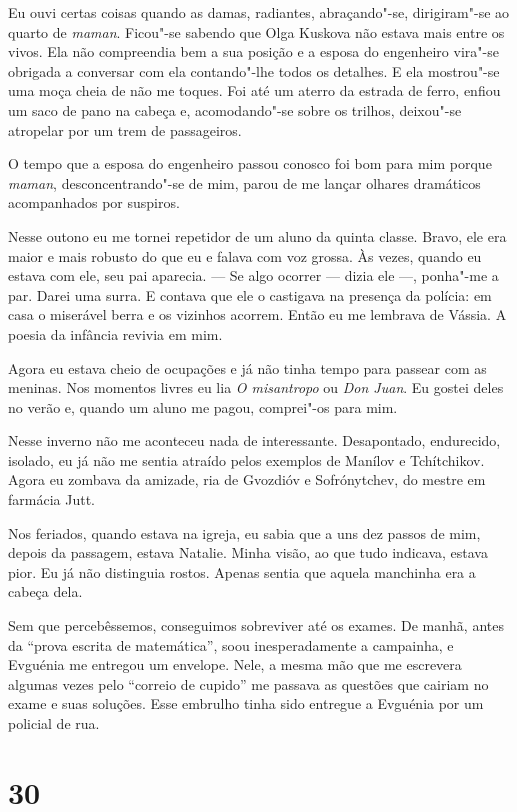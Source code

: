 Eu ouvi certas coisas quando as damas, radiantes, abraçando"-se,
dirigiram"-se ao quarto de \emph{maman}. Ficou"-se sabendo que Olga
Kuskova não estava mais entre os vivos. Ela não compreendia bem a sua
posição e a esposa do engenheiro vira"-se obrigada a conversar com ela
contando"-lhe todos os detalhes. E ela mostrou"-se uma moça cheia de não
me toques. Foi até um aterro da estrada de ferro, enfiou um saco de pano
na cabeça e, acomodando"-se sobre os trilhos, deixou"-se atropelar por um
trem de passageiros.

O tempo que a esposa do engenheiro passou conosco foi bom para mim
porque \emph{maman}, desconcentrando"-se de mim, parou de me lançar
olhares dramáticos acompanhados por suspiros.

Nesse outono eu me tornei repetidor de um aluno da quinta classe. Bravo,
ele era maior e mais robusto do que eu e falava com voz grossa. Às
vezes, quando eu estava com ele, seu pai aparecia. --- Se algo ocorrer
--- dizia ele ---, ponha"-me a par. Darei uma surra. E contava que ele o
castigava na presença da polícia: em casa o miserável berra e os
vizinhos acorrem. Então eu me lembrava de Vássia. A poesia da infância
revivia em mim.

Agora eu estava cheio de ocupações e já não tinha tempo para passear com
as meninas. Nos momentos livres eu lia \emph{O misantropo} ou \emph{Don
Juan}. Eu gostei deles no verão e, quando um aluno me pagou, comprei"-os
para mim.

Nesse inverno não me aconteceu nada de interessante. Desapontado,
endurecido, isolado, eu já não me sentia atraído pelos exemplos de
Manílov e Tchítchikov. Agora eu zombava da amizade, ria de Gvozdióv e
Sofrónytchev, do mestre em farmácia Jutt.

Nos feriados, quando estava na igreja, eu sabia que a uns dez passos de
mim, depois da passagem, estava Natalie. Minha visão, ao que tudo
indicava, estava pior. Eu já não distinguia rostos. Apenas sentia que
aquela manchinha era a cabeça dela.

Sem que percebêssemos, conseguimos sobreviver até os exames. De manhã,
antes da ``prova escrita de matemática'', soou inesperadamente a
campainha, e Evguénia me entregou um envelope. Nele, a mesma mão que me
escrevera algumas vezes pelo ``correio de cupido'' me passava as
questões que cairiam no exame e suas soluções. Esse embrulho tinha sido
entregue a Evguénia por um policial de rua.

\section{30}

